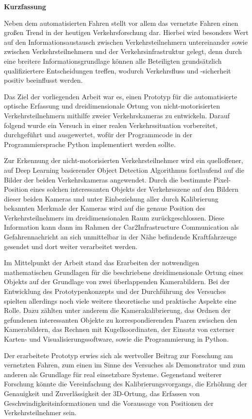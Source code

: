 \vfill 

{\bfseries\LARGE Kurzfassung}\\[20pt] 

\begin{small}
Neben dem automatisierten Fahren stellt vor allem das vernetzte Fahren einen großen Trend in der heutigen Verkehrsforschung dar. Hierbei wird besonders Wert auf den Informationsaustausch zwischen Verkehrsteilnehmern untereinander sowie zwischen Verkehrsteilnehmern und der Verkehrsinfrastruktur gelegt, denn durch eine breitere Informationsgrundlage können alle Beteiligten grundsätzlich qualifiziertere Entscheidungen treffen, wodurch Verkehrsfluss und -sicherheit positiv beeinflusst werden.\kleinerabstand

\noindent Das Ziel der vorliegenden Arbeit war es, einen Prototyp für die automatisierte optische Erfassung und dreidimensionale Ortung von nicht-motorisierten Verkehrsteilnehmern mithilfe zweier Verkehrskameras zu entwickeln. Darauf folgend wurde ein Versuch in einer realen Verkehrssituation vorbereitet, durchgeführt und ausgewertet, wofür der Programmcode in der Programmiersprache Python implementiert werden sollte.\kleinerabstand

\noindent Zur Erkennung der nicht-motorisierten Verkehrsteilnehmer wird ein quelloffener, auf Deep Learning basierender Object Detection Algorithmus fortlaufend auf die Bilder der beiden Verkehrskameras angewendet. Durch die bestimmte Pixel-Position eines solchen interessanten Objekts der Verkehrsszene auf den Bildern dieser beiden Kameras und unter Einbeziehung aller durch Kalibrierung bekannten Merkmale der Kameras wird auf die genaue Position des Verkehrsteilnehmers im dreidimensionalen Raum zurückgeschlossen. Diese Information kann dann im Rahmen der Car2Infrastructure Communication als Gefahrennachricht an sich unmittelbar in der Nähe befindende Kraftfahrzeuge gesendet und dort weiter verarbeitet werden.\kleinerabstand

\noindent Im Mittelpunkt der Arbeit stand das Erarbeiten der notwendigen mathematischen Grundlagen für die beschriebene dreidimensionale Ortung eines Objekts auf der Grundlage von zwei überlappenden Kamerabildern. Bei der Entwicklung des Prototypenkonzepts und der Durchführung des Versuches spielten allerdings noch viele weitere theoretische und praktische Aspekte eine Rolle. Dazu zählten unter anderem die Kamerakalibrierung, das Ordnen der gefundenen interessanten Objekte zu korrespondierenden Paaren zwischen den Kamerabildern, das Rechnen mit Kugelkoordinaten, der Einsatz von externer Karten- und Visualisierungssoftware, sowie die Programmierung in Python.\kleinerabstand

\noindent Der erarbeitete Prototyp erwies sich als wertvoller Beitrag zur Forschung am vernetzten Fahren, zum einen im Sinne des Versuches als Demonstrator und zum anderen als Grundlage für real einsetzbare Systeme.
Gegenstand weiterer Forschung könnte die Vereinfachung des Kalibrierungsvorgangs, die Erhöhung der Genauigkeit und Zuverlässigkeit der 3D-Ortung, das Erfassen von Geschwindigkeitsinformationen und die Voraussage von Positionen der Verkehrsteilnehmer sein.
\end{small}

\vfill
